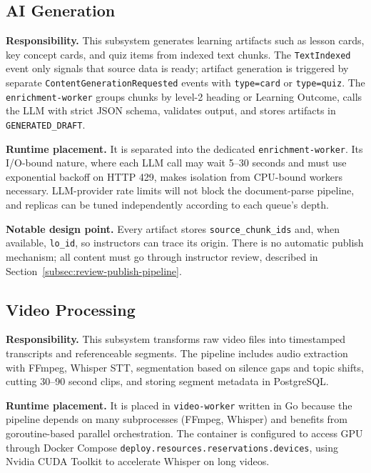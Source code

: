 \subsection{AI Generation}

\textbf{Responsibility.} This subsystem generates learning artifacts such
as lesson cards, key concept cards, and quiz items from indexed text
chunks. The \texttt{TextIndexed} event only signals that source data is
ready; artifact generation is triggered by separate
\texttt{ContentGenerationRequested} events with \texttt{type=card} or
\texttt{type=quiz}. The \texttt{enrichment-worker} groups chunks by
level-2 heading or Learning Outcome, calls the LLM with strict JSON
schema, validates output, and stores artifacts in
\texttt{GENERATED\_DRAFT}.

\textbf{Runtime placement.} It is separated into the dedicated
\texttt{enrichment-worker}. Its I/O-bound nature, where each LLM call may
wait 5--30 seconds and must use exponential backoff on HTTP 429, makes
isolation from CPU-bound workers necessary. LLM-provider rate limits will
not block the document-parse pipeline, and replicas can be tuned
independently according to each queue's depth.

\textbf{Notable design point.} Every artifact stores
\texttt{source\_chunk\_ids} and, when available, \texttt{lo\_id}, so
instructors can trace its origin. There is no automatic publish
mechanism; all content must go through instructor review, described in
Section~\ref{subsec:review-publish-pipeline}.

\subsection{Video Processing}

\textbf{Responsibility.} This subsystem transforms raw video files into
timestamped transcripts and referenceable segments. The pipeline includes
audio extraction with FFmpeg, Whisper STT, segmentation based on silence
gaps and topic shifts, cutting 30--90 second clips, and storing segment
metadata in PostgreSQL.

\textbf{Runtime placement.} It is placed in \texttt{video-worker} written
in Go because the pipeline depends on many subprocesses (FFmpeg, Whisper)
and benefits from goroutine-based parallel orchestration. The container
is configured to access GPU through Docker Compose
\texttt{deploy.resources.reservations.devices}, using Nvidia CUDA Toolkit
to accelerate Whisper on long videos.

